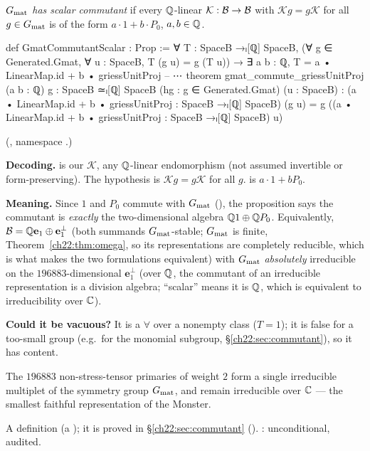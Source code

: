 \begin{definition}\label{ch22:def:commutant}
\emph{$G_{\mathrm{mat}}$ has scalar commutant} if every ${\mathbb{Q}}$-linear $\mathcal K:\mathcal{B}\to\mathcal{B}$ with $\mathcal Kg=g\mathcal K$ for
all $g\in G_{\mathrm{mat}}$ is of the form $a\cdot1+b\cdot P_0$, $a,b\in{\mathbb{Q}}$.
\end{definition}
\begin{leancode}
def GmatCommutantScalar : Prop :=
  ∀ T : SpaceB →ₗ[ℚ] SpaceB, (∀ g ∈ Generated.Gmat, ∀ u : SpaceB, T (g u) = g (T u)) →
    ∃ a b : ℚ, T = a • LinearMap.id + b • griessUnitProj
-- ⋯
theorem gmat_commute_griessUnitProj (a b : ℚ) {g : SpaceB ≃ₗ[ℚ] SpaceB}
    (hg : g ∈ Generated.Gmat) (u : SpaceB) :
    (a • LinearMap.id + b • griessUnitProj : SpaceB →ₗ[ℚ] SpaceB) (g u)
      = g ((a • LinearMap.id + b • griessUnitProj : SpaceB →ₗ[ℚ] SpaceB) u)
\end{leancode}
(, namespace .)
\begin{dictionary}
\textbf{Decoding.}   is our $\mathcal K$, any ${\mathbb{Q}}$-linear endomorphism (not assumed invertible or
form-preserving).  The hypothesis  is $\mathcal Kg=g\mathcal K$ for all $g$.
 is $a\cdot1+bP_0$.

\textbf{Meaning.}  Since $1$ and $P_0$ commute with $G_{\mathrm{mat}}$ (), the proposition
says the commutant is \emph{exactly} the two-dimensional algebra ${\mathbb{Q}}1\oplus{\mathbb{Q}} P_0$.  Equivalently,
$\mathcal{B}={\mathbb{Q}} \mathbf{e}_1\oplus \mathbf{e}_1^\perp$ (both summands $G_{\mathrm{mat}}$-stable; $G_{\mathrm{mat}}$ is finite,
Theorem~\ref{ch22:thm:omega}, so its representations are completely reducible, which is what makes the two formulations
equivalent) with $G_{\mathrm{mat}}$ \emph{absolutely} irreducible on the $196883$-dimensional
$\mathbf{e}_1^\perp$ (over ${\mathbb{Q}}$, the commutant of an irreducible representation is a division algebra; ``scalar'' means it is ${\mathbb{Q}}$,
which is equivalent to irreducibility over ${\mathbb{C}}$).

\textbf{Could it be vacuous?}  It is a $\forall$ over a nonempty class ($T=1$); it is false for a too-small group (e.g.\ for
the monomial subgroup, \S\ref{ch22:sec:commutant}), so it has content.
\end{dictionary}
\begin{physics}
The $196883$ non-stress-tensor primaries of weight $2$ form a single irreducible multiplet of the symmetry group
$G_{\mathrm{mat}}$, and remain irreducible over ${\mathbb{C}}$ --- the smallest faithful representation of the Monster.
\end{physics}
\begin{status}A definition (a ); it is proved in \S\ref{ch22:sec:commutant} ().
: unconditional, audited.\end{status}

